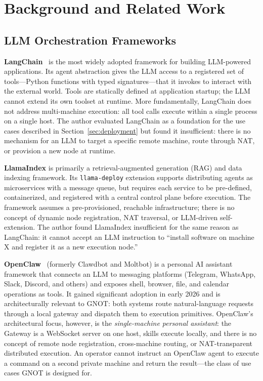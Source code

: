 \documentclass[10pt,twocolumn]{article}
\begin{document}
\section{Background and Related Work}
\label{sec:background}

\subsection{LLM Orchestration Frameworks}

\textbf{LangChain}~\cite{langchain2023} is the most widely adopted
framework for building LLM-powered applications. Its agent abstraction
gives the LLM access to a registered set of tools---Python functions
with typed signatures---that it invokes to interact with the external
world. Tools are statically defined at application startup; the LLM
cannot extend its own toolset at runtime. More fundamentally, LangChain
does not address multi-machine execution: all tool calls execute within
a single process on a single host. The author evaluated LangChain as a
foundation for the use cases described in Section~\ref{sec:deployment}
but found it insufficient: there is no mechanism for an LLM to target
a specific remote machine, route through NAT, or provision a new node
at runtime.

\textbf{LlamaIndex} is primarily a retrieval-augmented generation (RAG)
and data indexing framework. Its \texttt{llama-deploy} extension
supports distributing agents as microservices with a message queue, but
requires each service to be pre-defined, containerized, and registered
with a central control plane before execution. The framework assumes a
pre-provisioned, reachable infrastructure; there is no concept of
dynamic node registration, NAT traversal, or LLM-driven self-extension.
The author found LlamaIndex insufficient for the same reason as
LangChain: it cannot accept an LLM instruction to ``install software on
machine X and register it as a new execution node.''

\textbf{OpenClaw}~\cite{openclaw2026} (formerly Clawdbot and Moltbot)
is a personal AI assistant framework that connects an LLM to messaging
platforms (Telegram, WhatsApp, Slack, Discord, and others) and exposes
shell, browser, file, and calendar operations as tools. It gained
significant adoption in early 2026 and is architecturally relevant to
GNOT: both systems route natural-language requests through a local
gateway and dispatch them to execution primitives. OpenClaw's
architectural focus, however, is the \emph{single-machine personal
assistant}: the Gateway is a WebSocket server on one host, skills
execute locally, and there is no concept of remote node registration,
cross-machine routing, or NAT-transparent distributed execution. An
operator cannot instruct an OpenClaw agent to execute a command on a
second private machine and return the result---the class of use cases
GNOT is designed for.
\end{document}
